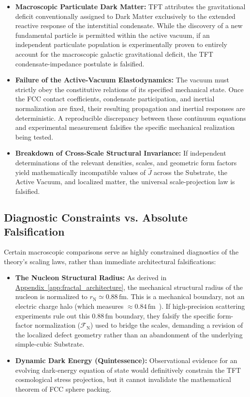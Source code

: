 \begin{itemize}
    \item \textbf{Macroscopic Particulate Dark Matter:} TFT attributes the gravitational deficit conventionally assigned to Dark Matter exclusively to the extended reactive response of the interstitial condensate. While the discovery of a new fundamental particle is permitted within the active vacuum, if an independent particulate population is experimentally proven to entirely account for the macroscopic galactic gravitational deficit, the TFT condensate-impedance postulate is falsified.

    \item \textbf{Failure of the Active-Vacuum Elastodynamics:} The vacuum must strictly obey the constitutive relations of its specified mechanical state. Once the FCC contact coefficients, condensate participation, and inertial normalization are fixed, their resulting propagation and inertial responses are deterministic. A reproducible discrepancy between these continuum equations and experimental measurement falsifies the specific mechanical realization being tested.

    \item \textbf{Breakdown of Cross-Scale Structural Invariance:} If independent determinations of the relevant densities, scales, and geometric form factors yield mathematically incompatible values of $\hat{J}$ across the Substrate, the Active Vacuum, and localized matter, the universal scale-projection law is falsified.
\end{itemize}

\subsection*{Diagnostic Constraints vs. Absolute Falsification}

Certain macroscopic comparisons serve as highly constrained diagnostics of the theory's scaling laws, rather than immediate architectural falsifications:

\begin{itemize}
    \item \textbf{The Nucleon Structural Radius:} As derived in \hyperref[app:fractal_architecture]{Appendix~\ref*{app:fractal_architecture}}, the mechanical structural radius of the nucleon is normalized to $r_{\mathrm N} \simeq 0.88\,\mathrm{fm}$. This is a mechanical boundary, not an electric charge halo (which measures $\approx 0.84\,\mathrm{fm}$~\cite{Pohl_2010}). If high-precision scattering experiments rule out this $0.88\,\mathrm{fm}$ boundary, they falsify the specific form-factor normalization ($\mathcal{F}_{\mathrm N}$) used to bridge the scales, demanding a revision of the localized defect geometry rather than an abandonment of the underlying simple-cubic Substrate.

    \item \textbf{Dynamic Dark Energy (Quintessence):} Observational evidence for an evolving dark-energy equation of state would definitively constrain the TFT cosmological stress projection, but it cannot invalidate the mathematical theorem of FCC sphere packing.
\end{itemize}

